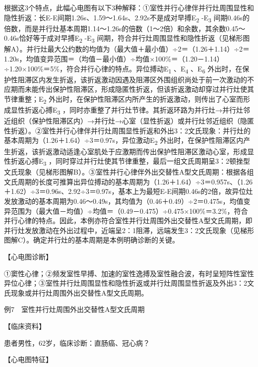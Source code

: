 根据这3个特点，此幅心电图有以下3种解释：①室性并行心律伴并行灶周围显性和隐性折返：长E-E间期1.26s、1.59～1.64s、2.92s不是成对早搏E\textsubscript{2}
-E\textsubscript{3}
间期0.46s的倍数，而是并行灶基本周期1.14～1.26s的倍数（1～2倍）和余数，其余数0.45～0.46s恰好等于成对早搏E\textsubscript{2}
-E\textsubscript{3}
间期，符合并行灶周围显性和隐性折返（见梯形图解A）。并行灶最大公约数的均值为（最大值＋最小值）÷2＝（1.26＋1.14）÷2＝1.20s，均值变异范围＝（均值－最小值）÷均值×100\%＝（1.20－1.14）÷1.20×100\%＝5\%，符合并行心律的特点。异位搏动E\textsubscript{1}
、E\textsubscript{4} 、E\textsubscript{6}
外出时，在保护性阻滞区内发生折返，该折返激动因遇及阻滞区外围组织尚处于前一次激动的不应期而未能传出保护性阻滞区，形成隐匿性折返，但该折返激动却穿过并行灶使其节律重整；E\textsubscript{2}
外出时，在保护性阻滞区内所产生的折返激动，则传出了心室而形成显性折返心搏E\textsubscript{3}
，同时亦重整了并行灶节律。其折返环路为并行灶→并行灶邻近组织（保护性阻滞区内）→并行灶→心室（显性折返）或并行灶邻近组织（隐匿性折返）。②室性并行心律伴并行灶周围显性折返和外出3：2文氏现象：并行灶的基本周期为（1.26＋1.64）÷3＝0.97s，异位激动E\textsubscript{2}
外出时，在保护性阻滞区内产生折返，该折返激动适逢心室肌处于应激期而传出保护性阻滞区激动心室，形成显性折返心搏E\textsubscript{3}
，同时穿过并行灶使其节律重整，最后一组文氏周期呈3：2顿挫型文氏现象（见梯形图解B）。③室性并行心律伴外出交替性A型文氏周期：根据各组文氏周期的长度可推算出异位搏动的基本周期为（1.26＋1.64）÷3＝0.957s、（1.26＋1.62）÷3＝0.96s、2.92÷3＝0.97s，基本上为最短E-E间期0.46s的2倍，故异位灶发放激动的基本周期为0.46～0.49s，其均值为（0.46＋0.49）÷2＝0.475s，均值变异范围为（最大值－均值）÷均值＝（0.49－0.475）÷0.475×100\%＝3.2\%，符合并行心律的特点。因此，本例亦符合室性并行灶周围外出交替性A型文氏周期，即并行灶发放激动在外出过程中，近端呈2：1阻滞，远端发生3：2文氏现象（见梯形图解C）。确定并行灶的基本周期是本例明确诊断的关键。

【心电图诊断】

①窦性心律；②频发室性早搏、加速的室性逸搏及室性融合波，有时呈短阵性室性异位心律；③室性并行灶周围显性和隐性折返或并行灶周围显性折返及外出3：2文氏现象或并行灶周围外出交替性A型文氏周期。

例7　室性并行灶周围外出交替性A型文氏周期

【临床资料】

患者男性，62岁，临床诊断：直肠癌、冠心病？

【心电图特征】

